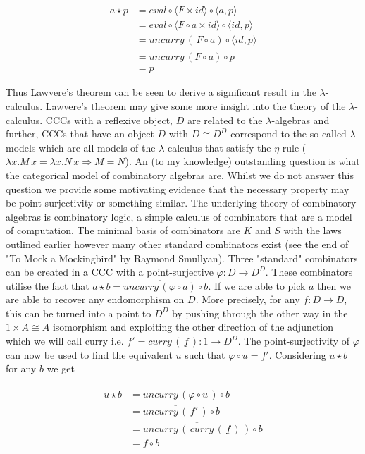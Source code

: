 \documentclass[a4paper,10pt]{article}
\begin{document}
\begin{align*}
    a \star p &= eval \circ \langle F \times id \rangle \circ \langle a , p
    \rangle \\
    &= eval \circ \langle F \circ a \times id \rangle \circ \langle id , p
    \rangle \\
    &= uncurry \, (\, F \circ a ) \circ \langle id , p \rangle \\
    &= \overline{uncurry \, (F \circ a)} \circ p \\
    &= p
\end{align*}

Thus Lawvere's theorem can be seen to derive a significant result in the
$\lambda$-calculus. Lawvere's theorem may give some more insight into the theory
of the $\lambda$-calculus. CCCs with a reflexive object, $D$ are related to the
$\lambda$-algebras and further, CCCs that have an object $D$ with $D \cong D^D$
correspond to the so called $\lambda$-models which are all models of the
$\lambda$-calculus that satisfy the $\eta$-rule ($\lambda x .  M \, x = \lambda
x . N \, x  \Rightarrow M = N$). An (to my knowledge) outstanding question is
what the categorical model of combinatory algebras are.  Whilst we do not answer
this question we provide some motivating evidence that the necessary property
may be point-surjectivity or something similar. The underlying theory of
combinatory algebras is combinatory logic, a simple calculus of combinators that
are a model of computation. The minimal basis of combinators are $K$ and $S$
with the laws outlined earlier however many other standard combinators exist
(see the end of "To Mock a Mockingbird" by Raymond Smullyan). Three "standard"
combinators can be created in a CCC with a point-surjective $\varphi : D
\rightarrow D^D$. These combinators utilise the fact that $a \star b =
\overline{uncurry \, (\varphi \circ a)} \circ b$. If we are able to pick $a$
then we are able to recover any endomorphism on $D$. More precisely, for any $f:
D \rightarrow D$, this can be turned into a point to $D^D$ by pushing through
the other way in the $1 \times A \cong A$ isomorphism and exploiting the other
direction of the adjunction which we will call curry i.e. $f' = curry \, (
\,\underline{f} \,) : 1 \rightarrow D^D$. The point-surjectivity of $\varphi$
can now be used to find the equivalent $u$ such that $\varphi \circ u = f'$.
Considering $u \star b$ for any $b$ we get

\begin{align*}
    u \star b &= \overline{uncurry \, (\varphi \circ u \, )} \circ b \\
    &= \overline{uncurry \, ( \, f' \, ) } \circ b \\
    &= \overline{uncurry \, ( \, curry \, ( \, \underline{f} \, ) \, )} \circ b \\
    &= f \circ b
\end{align*}
\end{document}
